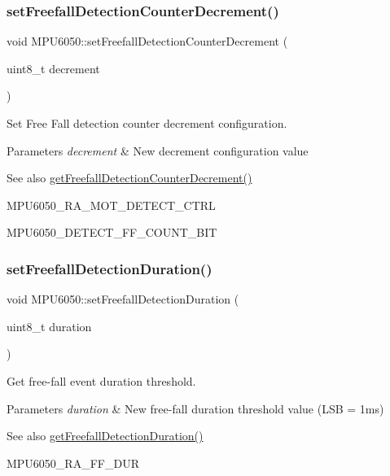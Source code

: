 \subsubsection{\texorpdfstring{setFreefallDetectionCounterDecrement()}{setFreefallDetectionCounterDecrement()}}
{\footnotesize\ttfamily void M\+P\+U6050\+::set\+Freefall\+Detection\+Counter\+Decrement (\begin{DoxyParamCaption}\item[{uint8\+\_\+t}]{decrement }\end{DoxyParamCaption})}

Set Free Fall detection counter decrement configuration. 
\begin{DoxyParams}{Parameters}
{\em decrement} & New decrement configuration value \\
\hline
\end{DoxyParams}
\begin{DoxySeeAlso}{See also}
\mbox{\hyperlink{class_m_p_u6050_af6d6fa9869636989a8b29c4827ad7de8}{get\+Freefall\+Detection\+Counter\+Decrement()}} 

M\+P\+U6050\+\_\+\+R\+A\+\_\+\+M\+O\+T\+\_\+\+D\+E\+T\+E\+C\+T\+\_\+\+C\+T\+RL 

M\+P\+U6050\+\_\+\+D\+E\+T\+E\+C\+T\+\_\+\+F\+F\+\_\+\+C\+O\+U\+N\+T\+\_\+\+B\+IT 
\end{DoxySeeAlso}
\mbox{\label{class_m_p_u6050_a41eeb40a654465966d260e3d31c4de4b}} 
\subsubsection{\texorpdfstring{setFreefallDetectionDuration()}{setFreefallDetectionDuration()}}
{\footnotesize\ttfamily void M\+P\+U6050\+::set\+Freefall\+Detection\+Duration (\begin{DoxyParamCaption}\item[{uint8\+\_\+t}]{duration }\end{DoxyParamCaption})}

Get free-\/fall event duration threshold. 
\begin{DoxyParams}{Parameters}
{\em duration} & New free-\/fall duration threshold value (L\+SB = 1ms) \\
\hline
\end{DoxyParams}
\begin{DoxySeeAlso}{See also}
\mbox{\hyperlink{class_m_p_u6050_a3cff6b9613ad01aa1a51c287f5c5e329}{get\+Freefall\+Detection\+Duration()}} 

M\+P\+U6050\+\_\+\+R\+A\+\_\+\+F\+F\+\_\+\+D\+UR 
\end{DoxySeeAlso}
\mbox{\label{class_m_p_u6050_af704e1a4eb01522b146abeba78c32716}} 
